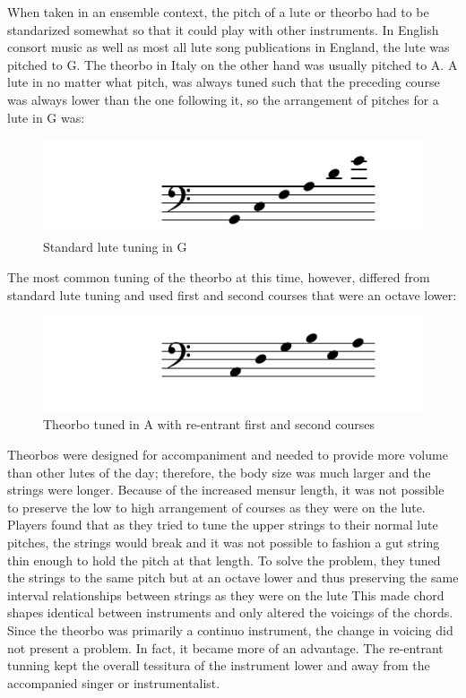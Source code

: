 When taken in an ensemble context, the pitch of a lute or theorbo had to be standarized
somewhat so that it could play with other instruments.  In English consort music as well
as most all lute song publications in England, the lute was pitched to G.  The theorbo in
Italy on the other hand was usually pitched to A.  A lute in no matter what pitch, was
always tuned such that the preceding course was always lower than the one following it, so
the arrangement of pitches for a lute in G was:
\begin{figure}[h]
\centering
\includegraphics{examples/lute-tuning.pdf}
\caption{Standard lute tuning in G}
\end{figure}
The most common tuning of the theorbo at this time, however, differed from standard lute
tuning and used first and second courses that were an octave lower:
\begin{figure}[h]
\centering
\includegraphics{examples/theorbo-tuning.pdf}
\caption{Theorbo tuned in A with re-entrant first and second courses}
\end{figure}

Theorbos were designed for accompaniment and needed to provide more volume than other
lutes of the day; therefore, the body size was much larger and the strings were longer.
Because of the increased mensur length, it was not possible to preserve the low to high
arrangement of courses as they were on the lute. Players found that as they tried to tune
the upper strings to their normal lute pitches, the strings would break and it was not
possible to fashion a gut string thin enough to hold the pitch at that length.  To solve
the problem, they tuned the strings to the same pitch but at an octave lower and thus
preserving the same interval relationships between strings as they were on the lute  This
made chord shapes identical between instruments and only altered the voicings of the
chords. Since the theorbo was primarily a continuo instrument, the change in voicing did
not present a problem. In fact, it became more of an advantage.  The re-entrant tunning
kept the overall tessitura of the instrument lower and away from the accompanied singer or
instrumentalist.

